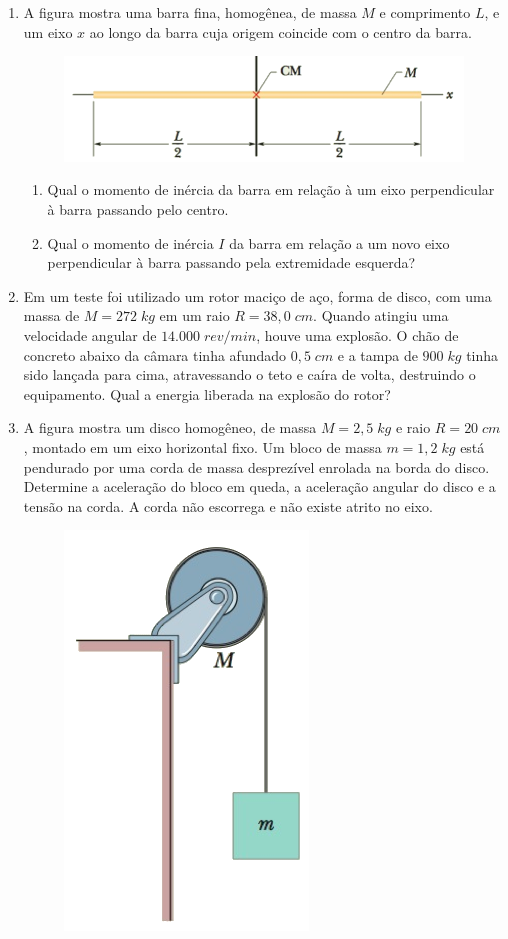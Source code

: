 \documentclass[brazil]{article}
\begin{document}
\begin{enumerate}
\item A figura mostra uma barra fina, homogênea, de massa $M$ e comprimento $L$, e um eixo $x$ ao longo da barra cuja origem coincide com o centro da barra.
\begin{figure}[H]
\hfill \includegraphics[scale=0.4]{figs/barra-momento.png}
\end{figure}
\begin{enumerate}
\item Qual o momento de inércia da barra em relação à um eixo perpendicular à barra passando pelo centro.
\item Qual o momento de inércia $I$ da barra em relação a um novo eixo perpendicular à barra passando pela extremidade esquerda?
\end{enumerate}


\item Em um teste foi utilizado um rotor maciço de aço, forma de disco, com uma massa de $M=272\;kg$ em um raio $R=38,0\;cm$. Quando atingiu uma velocidade angular de $14.000\;rev/min$, houve uma explosão. O chão de concreto abaixo da câmara tinha afundado $0,5\;cm$ e a tampa de $900\;kg$ tinha sido lançada para cima, atravessando o teto e caíra de volta, destruindo o equipamento. Qual a energia liberada na explosão do rotor?


\item A figura mostra um disco homogêneo, de massa $M=2,5\;kg$ e raio $R=20\;cm$, montado em um eixo horizontal fixo. Um bloco de massa $m=1,2\;kg$ está pendurado por uma corda de massa desprezível enrolada na borda do disco. Determine a aceleração do bloco em queda, a aceleração angular do disco e a tensão na corda. A corda não escorrega e não existe atrito no eixo.
\begin{figure}[H]
\hfill \includegraphics[scale=0.4]{figs/disco-homogeneo.png}
\end{figure}
	


\end{enumerate}
\end{document}
